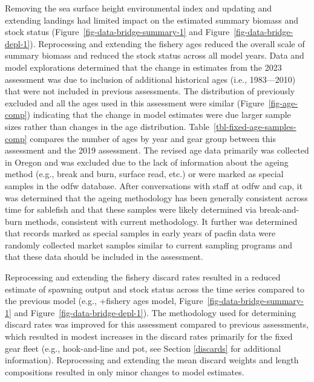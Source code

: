\documentclass[
  english,
]{article}
\begin{document}
Removing the sea surface height environmental index and updating and
extending landings had limited impact on the estimated summary biomass
and stock status (Figure~\ref{fig-data-bridge-summary-1} and
Figure~\ref{fig-data-bridge-depl-1}). Reprocessing and extending the
fishery ages reduced the overall scale of summary biomass and reduced
the stock status across all model years. Data and model explorations
determined that the change in estimates from the 2023 assessment was due
to inclusion of additional historical ages (i.e., 1983---2010) that were
not included in previous assessments. The distribution of previously
excluded and all the ages used in this assessment were similar
(Figure~\ref{fig-age-comp}) indicating that the change in model
estimates were due larger sample sizes rather than changes in the age
distribution. Table~\ref{tbl-fixed-age-samples-comp} compares the number
of ages by year and gear group between this assessment and the 2019
assessment. The revised age data primarily was collected in Oregon and
was excluded due to the lack of information about the ageing method
(e.g., break and burn, surface read, etc.) or were marked as special
samples in the \gls{odfw} database. After conversations with staff at
\gls{odfw} and \gls{cap}, it was determined that the ageing methodology
has been generally consistent across time for sablefish and that these
samples were likely determined via break-and-burn methods, consistent
with current methodology. It further was determined that records marked
as special samples in early years of \gls{pacfin} data were randomly
collected market samples similar to current sampling programs and that
these data should be included in the assessment.

Reprocessing and extending the fishery discard rates resulted in a
reduced estimate of spawning output and stock status across the time
series compared to the previous model (e.g., +fishery ages model,
Figure~\ref{fig-data-bridge-summary-1} and
Figure~\ref{fig-data-bridge-depl-1}). The methodology used for
determining discard rates was improved for this assessment compared to
previous assessments, which resulted in modest increases in the discard
rates primarily for the fixed gear fleet (e.g., hook-and-line and pot,
see Section \ref{discards} for additional information). Reprocessing and
extending the mean discard weights and length compositions resulted in
only minor changes to model estimates.
\end{document}
